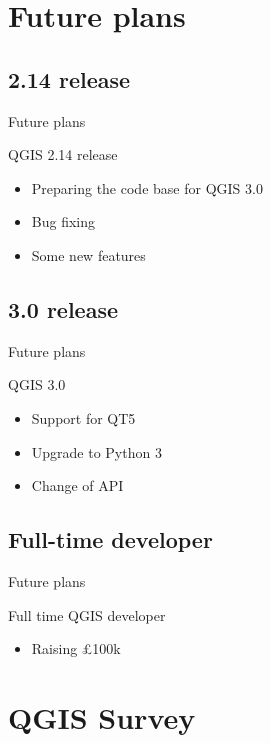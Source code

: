 \section{Future plans}
\subsection{2.14 release}

\begin{frame}{Future plans}
	\begin{block}{QGIS 2.14 release}
		\begin{itemize}
			\item Preparing the code base for QGIS 3.0
			\item Bug fixing 
			\item Some new features
		\end{itemize}
	\end{block}
\end{frame}

\subsection{3.0 release}
\begin{frame}{Future plans}
	\begin{block}{QGIS 3.0}
		\begin{itemize}
			\item Support for QT5
			\item Upgrade to Python 3
			\item Change of API
		\end{itemize}
	\end{block}
\end{frame}

\subsection{Full-time developer}
\begin{frame}{Future plans}
	\begin{block}{Full time QGIS developer}
		\begin{itemize}
			\item Raising \pounds100k
		\end{itemize}
	\end{block}
\end{frame}

\section{QGIS Survey}


